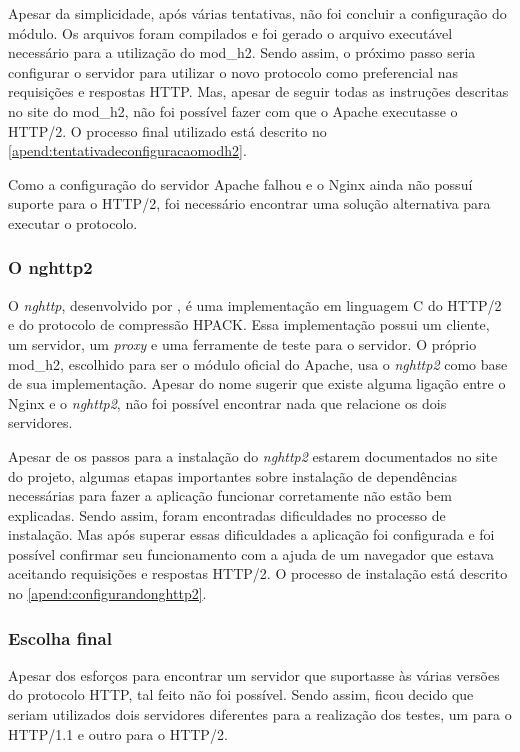 Apesar da simplicidade, após várias tentativas, não foi concluir a configuração do módulo. Os arquivos foram compilados e foi gerado o arquivo executável necessário para a utilização do mod\_h2. Sendo assim, o próximo passo seria configurar o servidor para utilizar o novo protocolo como preferencial nas requisições e respostas HTTP. Mas, apesar de seguir todas as instruções descritas no site do mod\_h2, não foi possível fazer com que o Apache executasse o HTTP/2. O processo final utilizado está descrito no \autoref{apend:tentativadeconfiguracaomodh2}.

Como a configuração do servidor Apache falhou e o Nginx ainda não possuí suporte para o HTTP/2, foi necessário encontrar uma solução alternativa para executar o protocolo.

\subsubsection{O nghttp2}
\label{onghttp2}

O \textit{nghttp}, desenvolvido por , é uma implementação em linguagem C do HTTP/2 e do protocolo de compressão HPACK. Essa implementação possui um cliente, um servidor, um \textit{proxy} e uma ferramente de teste para o servidor. O próprio mod\_h2, escolhido para ser o módulo oficial do Apache, usa o \textit{nghttp2} como base de sua implementação. Apesar do nome sugerir que existe alguma ligação entre o Nginx e o \textit{nghttp2}, não foi possível encontrar nada que relacione os dois servidores.

Apesar de os passos para a instalação do \textit{nghttp2} estarem documentados no site do projeto, algumas etapas importantes sobre instalação de dependências necessárias para fazer a aplicação funcionar corretamente não estão bem explicadas. Sendo assim, foram encontradas dificuldades no processo de instalação. Mas após superar essas dificuldades a aplicação foi configurada e foi possível confirmar seu funcionamento com a ajuda de um navegador que estava aceitando requisições e respostas HTTP/2. O processo de instalação está descrito no \autoref{apend:configurandonghttp2}.

\subsubsection{Escolha final}
\label{escolhafinal}

Apesar dos esforços para encontrar um servidor que suportasse às várias versões do protocolo HTTP, tal feito não foi possível. Sendo assim, ficou decido que seriam utilizados dois servidores diferentes para a realização dos testes, um para o HTTP/1.1 e outro para o HTTP/2.

